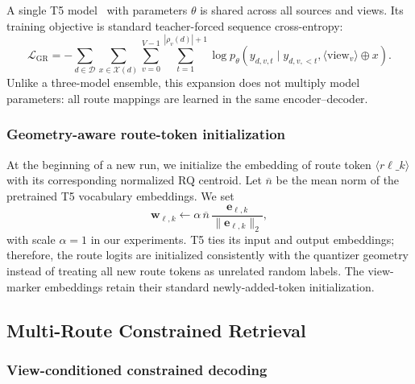 A single T5 model~\citep{raffel2020t5} with parameters $\theta$ is shared across all sources and views. Its training objective is standard teacher-forced sequence cross-entropy:
\begin{equation}
\label{eq:gr-loss}
    \mathcal{L}_{\mathrm{GR}}
    =-\sum_{d\in\mathcal{D}}
      \sum_{x\in\mathcal{X}(d)}
      \sum_{v=0}^{V-1}
      \sum_{t=1}^{|\rho_v(d)|+1}
      \log p_{\theta}\!\left(
        y_{d,v,t}\mid y_{d,v,<t},
        \langle\mathrm{view}_v\rangle\oplus x
      \right).
\end{equation}
Unlike a three-model ensemble, this expansion does not multiply model parameters: all route mappings are learned in the same encoder--decoder.

\subsubsection{Geometry-aware route-token initialization}

At the beginning of a new run, we initialize the embedding of route token $\langle r\ell\_k\rangle$ with its corresponding normalized RQ centroid. Let $\overline{n}$ be the mean norm of the pretrained T5 vocabulary embeddings. We set
\begin{equation}
    \mathbf{w}_{\ell,k}
    \leftarrow
    \alpha\,\overline{n}\,
    \frac{\mathbf{e}_{\ell,k}}
         {\|\mathbf{e}_{\ell,k}\|_2},
\end{equation}
with scale $\alpha=1$ in our experiments. T5 ties its input and output embeddings; therefore, the route logits are initialized consistently with the quantizer geometry instead of treating all new route tokens as unrelated random labels. The view-marker embeddings retain their standard newly-added-token initialization.

\subsection{Multi-Route Constrained Retrieval}
\label{sec:inference}

\subsubsection{View-conditioned constrained decoding}

